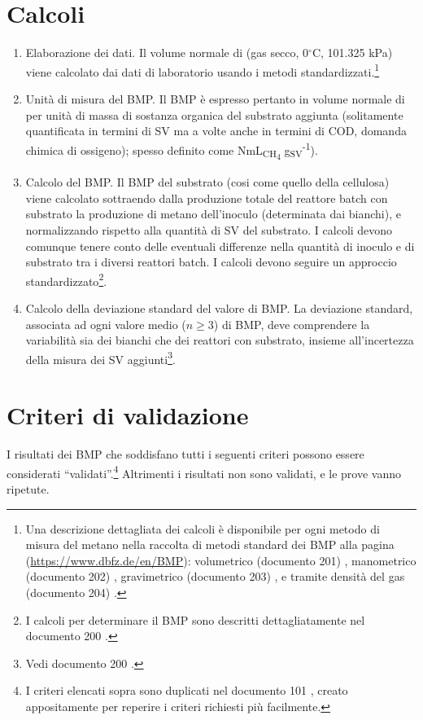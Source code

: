 \documentclass[]{article}
\begin{document}
\section{Calcoli}
\label{sec:calculations}
\begin{enumerate}
  \item Elaborazione dei dati.
    Il volume normale di  (gas secco, 0$^\circ$C, 101.325 kPa) viene calcolato dai dati di laboratorio usando i metodi standardizzati.\footnote{
      Una descrizione dettagliata dei calcoli è disponibile per ogni metodo di misura del metano nella raccolta di metodi standard dei BMP alla pagina (\url{https://www.dbfz.de/en/BMP}): volumetrico (documento 201) \citep{BMPdoc201vol}, manometrico (documento 202) \citep{BMPdoc202man}, gravimetrico (documento 203) \citep{BMPdoc203grav}, e tramite densità del gas (documento 204) \citep{BMPdoc204gasdens}.
    }
  \item Unità di misura del BMP.
    Il BMP è espresso pertanto in volume normale di  per unità di massa di sostanza organica del substrato aggiunta (solitamente quantificata in termini di SV ma a volte anche in termini di COD, domanda chimica di ossigeno); spesso definito come NmL\textsubscript{CH\textsubscript{4}} g\textsubscript{SV}\textsuperscript{-1}). 
  \item Calcolo del BMP. 
    Il BMP del substrato (cosi come quello della cellulosa) viene calcolato sottraendo dalla produzione totale del reattore batch con substrato la produzione di metano dell’inoculo (determinata dai bianchi), e normalizzando rispetto alla quantità di SV del substrato. 
    I calcoli devono comunque tenere conto delle eventuali differenze nella quantità di inoculo e di substrato tra i diversi reattori batch. I calcoli devono seguire un approccio standardizzato\footnote{
      I calcoli per determinare il BMP sono descritti dettagliatamente nel documento 200 \citep{BMPdoc200BMP}.
    }.
  \item Calcolo della deviazione standard del valore di BMP. 
    La deviazione standard, associata ad ogni valore medio ($n \ge 3$) di BMP, deve comprendere la variabilità sia dei bianchi che dei reattori con substrato, insieme all’incertezza della misura dei SV aggiunti\footnote{
      Vedi documento 200 \citep{BMPdoc200BMP}. 
    }.
\end{enumerate}

\section{Criteri di validazione}
\label{sec:crit}
I risultati dei BMP che soddisfano tutti i seguenti criteri possono essere considerati ``validati''.\footnote{
  I criteri elencati sopra sono duplicati nel documento 101 \citep{BMPdoc101val}, creato appositamente per reperire i criteri richiesti più facilmente.
}
Altrimenti i risultati non sono validati, e le prove vanno ripetute.
\end{document}
